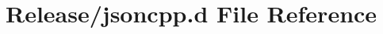 \hypertarget{Release_2jsoncpp_8d}{}\section{Release/jsoncpp.d File Reference}
\label{Release_2jsoncpp_8d}
